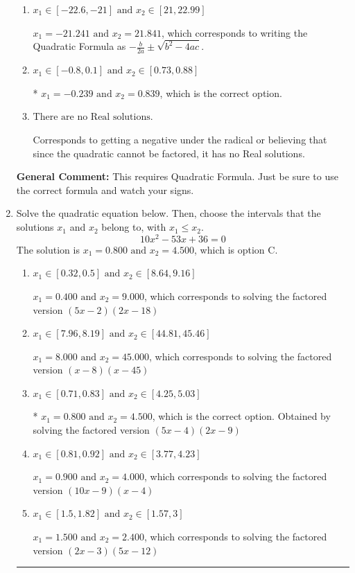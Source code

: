 \documentclass{extbook}[14pt]
\newcommand{\litem}[1]{\item #1

\rule{\textwidth}{0.4pt}}
\begin{document}
\begin{enumerate}
{\begin{enumerate}[label=\Alph*.]
 $x_1 = -4.770 \text{ and } x_2 = 16.770$, which corresponds to using the Quadratic Formula with $a=1$
\item \( x_1 \in [-22.6, -21] \text{ and } x_2 \in [21, 22.99] \)

 $x_1 = -21.241 \text{ and } x_2 = 21.841$, which corresponds to writing the Quadratic Formula as $-\frac{b}{2a} \pm \sqrt{b^2 - 4ac}$.
\item \( x_1 \in [-0.8, 0.1] \text{ and } x_2 \in [0.73, 0.88] \)

* $x_1 = -0.239 \text{ and } x_2 = 0.839$, which is the correct option.
\item \( \text{There are no Real solutions.} \)

Corresponds to getting a negative under the radical or believing that since the quadratic cannot be factored, it has no Real solutions.
\end{enumerate}

\textbf{General Comment:} This requires Quadratic Formula. Just be sure to use the correct formula and watch your signs.
}
\litem{
Solve the quadratic equation below. Then, choose the intervals that the solutions $x_1$ and $x_2$ belong to, with $x_1 \leq x_2$.
\[ 10x^{2} -53 x + 36 = 0 \]The solution is \( x_1 = 0.800 \text{ and } x_2 = 4.500 \), which is option C.\begin{enumerate}[label=\Alph*.]
\item \( x_1 \in [0.32, 0.5] \text{ and } x_2 \in [8.64, 9.16] \)

$x_1 = 0.400 \text{ and } x_2 = 9.000$, which corresponds to solving the factored version $(5x -2)(2x -18)$
\item \( x_1 \in [7.96, 8.19] \text{ and } x_2 \in [44.81, 45.46] \)

$x_1 = 8.000 \text{ and } x_2 = 45.000$, which corresponds to solving the factored version $(x -8)(x -45)$
\item \( x_1 \in [0.71, 0.83] \text{ and } x_2 \in [4.25, 5.03] \)

* $x_1 = 0.800 \text{ and } x_2 = 4.500$, which is the correct option. Obtained by solving the factored version $(5x -4)(2x -9)$
\item \( x_1 \in [0.81, 0.92] \text{ and } x_2 \in [3.77, 4.23] \)

$x_1 = 0.900 \text{ and } x_2 = 4.000$, which corresponds to solving the factored version $(10x -9)(x -4)$
\item \( x_1 \in [1.5, 1.82] \text{ and } x_2 \in [1.57, 3] \)

$x_1 = 1.500 \text{ and } x_2 = 2.400$, which corresponds to solving the factored version $(2x -3)(5x -12)$
\end{enumerate}

}
\end{enumerate}
\end{document}
